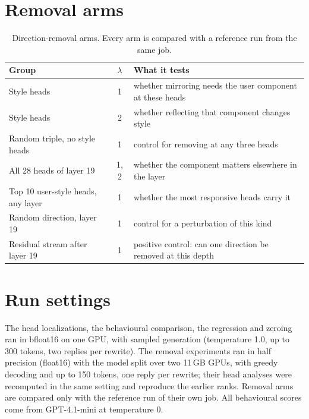 \section{Removal arms}
\label{app:arms}
\begin{table}[h]
\centering
\small
\begin{tabularx}{\columnwidth}{@{}lcX@{}}
\toprule
Group & $\lambda$ & What it tests \\
\midrule
Style heads & 1 & whether mirroring needs the user component at these heads \\
Style heads & 2 & whether reflecting that component changes style \\
Random triple, no style heads & 1 & control for removing at any three heads \\
All 28 heads of layer 19 & 1, 2 & whether the component matters elsewhere in the layer \\
Top 10 user-style heads, any layer & 1 & whether the most responsive heads carry it \\
Random direction, layer 19 & 1 & control for a perturbation of this kind \\
Residual stream after layer 19 & 1 & positive control: can one direction be removed at this depth \\
\bottomrule
\end{tabularx}
\caption{Direction-removal arms. Every arm is compared with a reference run from the same job.}
\label{tab:arms}
\end{table}

\section{Run settings}
\label{app:settings}
The head localizations, the behavioural comparison, the regression and zeroing ran in bfloat16 on one GPU, with sampled generation (temperature 1.0, up to 300 tokens, two replies per rewrite). The removal experiments ran in half precision (float16) with the model split over two 11\,GB GPUs, with greedy decoding and up to 150 tokens, one reply per rewrite; their head analyses were recomputed in the same setting and reproduce the earlier ranks. Removal arms are compared only with the reference run of their own job. All behavioural scores come from GPT-4.1-mini at temperature 0.
